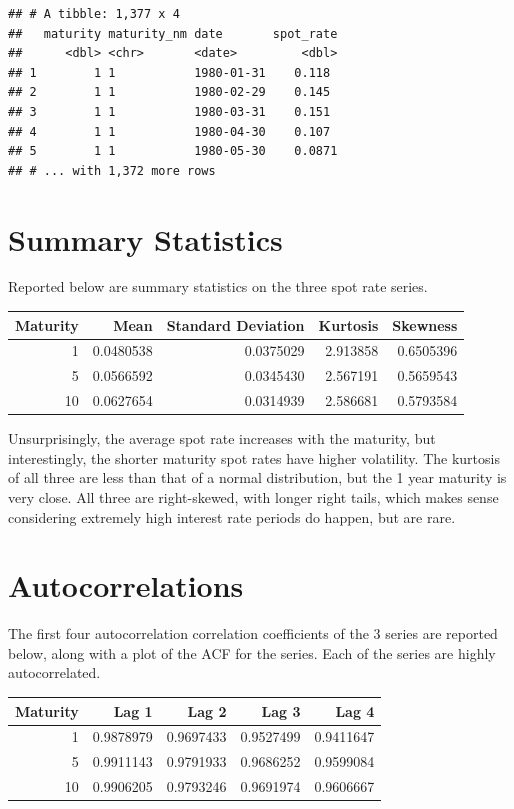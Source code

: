 \documentclass[]{book}
\theoremstyle{definition}
\theoremstyle{definition}
\theoremstyle{definition}
\theoremstyle{remark}
\begin{document}
\begin{verbatim}
## # A tibble: 1,377 x 4
##   maturity maturity_nm date       spot_rate
##      <dbl> <chr>       <date>         <dbl>
## 1        1 1           1980-01-31    0.118 
## 2        1 1           1980-02-29    0.145 
## 3        1 1           1980-03-31    0.151 
## 4        1 1           1980-04-30    0.107 
## 5        1 1           1980-05-30    0.0871
## # ... with 1,372 more rows
\end{verbatim}

\hypertarget{summary-statistics}{%
\section{Summary Statistics}\label{summary-statistics}}

Reported below are summary statistics on the three spot rate series.

\begin{tabular}{rrrrr}
\toprule
Maturity & Mean & Standard Deviation & Kurtosis & Skewness\\
\midrule
1 & 0.0480538 & 0.0375029 & 2.913858 & 0.6505396\\
5 & 0.0566592 & 0.0345430 & 2.567191 & 0.5659543\\
10 & 0.0627654 & 0.0314939 & 2.586681 & 0.5793584\\
\bottomrule
\end{tabular}

Unsurprisingly, the average spot rate increases with the maturity, but
interestingly, the shorter maturity spot rates have higher volatility.
The kurtosis of all three are less than that of a normal distribution,
but the 1 year maturity is very close. All three are right-skewed, with
longer right tails, which makes sense considering extremely high
interest rate periods do happen, but are rare.

\hypertarget{autocorrelations}{%
\section{Autocorrelations}\label{autocorrelations}}

The first four autocorrelation correlation coefficients of the 3 series
are reported below, along with a plot of the ACF for the series. Each of
the series are highly autocorrelated.

\begin{tabular}{r|r|r|r|r}
\hline
Maturity & Lag 1 & Lag 2 & Lag 3 & Lag 4\\
\hline
1 & 0.9878979 & 0.9697433 & 0.9527499 & 0.9411647\\
\hline
5 & 0.9911143 & 0.9791933 & 0.9686252 & 0.9599084\\
\hline
10 & 0.9906205 & 0.9793246 & 0.9691974 & 0.9606667\\
\hline
\end{tabular}
\end{document}
